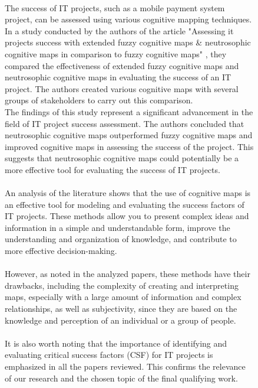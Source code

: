 \documentclass{article}
\begin{document}
\begin{figure}[!t]
\begin{minipage}{0.49\textwidth}
            ~\\
            The success of IT projects, such as a mobile payment system project, can be assessed using various cognitive mapping techniques.\\
            In a study conducted by the authors of the article "{}Assessing it projects success with extended fuzzy cognitive maps \& neutrosophic cognitive maps in comparison to fuzzy cognitive maps"{} \cite{litlink20}, they compared the effectiveness of extended fuzzy cognitive maps and neutrosophic cognitive maps in evaluating the success of an IT project. The authors created various cognitive maps with several groups of stakeholders to carry out this comparison.\\
            The findings of this study represent a significant advancement in the field of IT project success assessment. The authors concluded that neutrosophic cognitive maps outperformed fuzzy cognitive maps and improved cognitive maps in assessing the success of the project. This suggests that neutrosophic cognitive maps could potentially be a more effective tool for evaluating the success of IT projects.\\
            ~\\
            An analysis of the literature shows that the use of cognitive maps is an effective tool for modeling and evaluating the success factors of IT projects. These methods allow you to present complex ideas and information in a simple and understandable form, improve the understanding and organization of knowledge, and contribute to more effective decision-making.\\
            ~\\
            However, as noted in the analyzed papers, these methods have their drawbacks, including the complexity of creating and interpreting maps, especially with a large amount of information and complex relationships, as well as subjectivity, since they are based on the knowledge and perception of an individual or a group of people.\\
            ~\\
            It is also worth noting that the importance of identifying and evaluating critical success factors (CSF) for IT projects is emphasized in all the papers reviewed. This confirms the relevance of our research and the chosen topic of the final qualifying work.\\
            ~\\
            ~\\
            ~\\

\end{minipage}
\end{figure}
\end{document}
